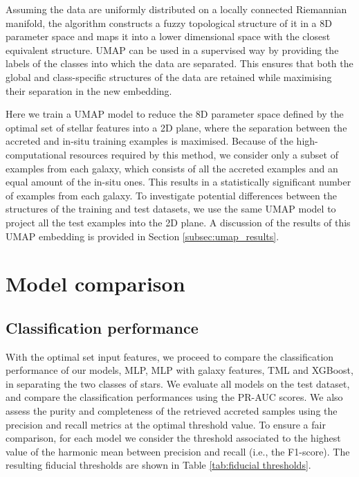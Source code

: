 Assuming the data are uniformly distributed on a locally connected Riemannian manifold, the algorithm constructs a fuzzy topological structure of it in a $8$D parameter space and maps it into a lower dimensional space with the closest equivalent structure. UMAP can be used in a supervised way by providing the labels of the classes into which the data are separated. This ensures that both the global and class-specific structures of the data are retained while maximising their separation in the new embedding.

Here we train a UMAP model to reduce the 8D parameter space defined by the optimal set of stellar features into a 2D plane, where the separation between the accreted and in-situ training examples is maximised. Because of the high-computational resources required by this method, we consider only a subset of examples from each galaxy, which consists of all the accreted examples and an equal amount of the in-situ ones. This results in a  statistically significant number of examples from each galaxy. To investigate potential differences between the structures of the training and test datasets, we use the same UMAP model to project all the test examples into the 2D plane. A discussion of the results of this UMAP embedding is provided in Section \ref{subsec:umap_results}.

\section{Model comparison}
\label{sec:results}

\subsection{Classification performance}
\label{subsec:comparison_ML}

With the optimal set input features, we proceed to compare the classification performance of our models, MLP, MLP with galaxy features, TML and XGBoost, in separating the two classes of stars. We evaluate all models on the test dataset, and compare the classification performances using the PR-AUC scores. We also assess the purity and completeness of the retrieved accreted samples using the precision and recall metrics at the optimal threshold value. To ensure a fair comparison, for each model we consider the threshold associated to the highest value of the harmonic mean between precision and recall (i.e., the F1-score). The resulting fiducial thresholds are shown in Table \ref{tab:fiducial thresholds}.


